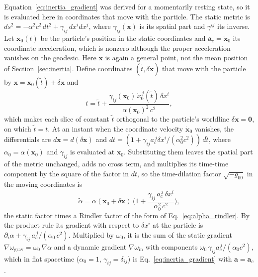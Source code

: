 \documentclass[aps,prd,onecolumn,tightenlines,nofootinbib,notitlepage,11pt,floatfix]{revtex4-2}
\theoremstyle{indentedtheorem}
\begin{document}
Equation~\eqref{eq:inertia_gradient} was derived for a momentarily resting state, so it is evaluated here in coordinates that move with the particle. The static metric is $ds^2=-\alpha^2c^2\,dt^2+\gamma_{ij}\,dx^idx^j$, where $\gamma_{ij}(\mathbf{x})$ is its spatial part and $\gamma^{ij}$ its inverse. Let $\mathbf{x}_0(t)$ be the particle's position in the static coordinates and $\mathbf{a}_c=\ddot{\mathbf{x}}_0$ its coordinate acceleration, which is nonzero although the proper acceleration vanishes on the geodesic. Here $\mathbf{x}$ is again a general point, not the mean position of Section~\ref{sec:inertia}. Define coordinates $(\tilde{t},\delta\mathbf{x})$ that move with the particle by $\mathbf{x}=\mathbf{x}_0(\tilde{t})+\delta\mathbf{x}$ and
\begin{equation}
    t = \tilde{t} + \frac{\gamma_{ij}(\mathbf{x}_0)\,\dot{x}_0^{\,j}(\tilde{t})\,\delta x^i}{\alpha(\mathbf{x}_0)^2\,c^2} ,
    \label{eq:moving_sync}
\end{equation}
which makes each slice of constant $\tilde{t}$ orthogonal to the particle's worldline $\delta\mathbf{x}=\mathbf{0}$, on which $\tilde{t}=t$. At an instant when the coordinate velocity $\dot{\mathbf{x}}_0$ vanishes, the differentials are $d\mathbf{x}=d(\delta\mathbf{x})$ and $dt=(1+\gamma_{ij}a_c^{\,j}\delta x^i/(\alpha_0^2c^2))\,d\tilde{t}$, where $\alpha_0=\alpha(\mathbf{x}_0)$ and $\gamma_{ij}$ is evaluated at $\mathbf{x}_0$. Substituting them leaves the spatial part of the metric unchanged, adds no cross term, and multiplies its time-time component by the square of the factor in $dt$, so the time-dilation factor $\sqrt{-g_{00}}$ in the moving coordinates is
\begin{equation}
    \tilde{\alpha} = \alpha(\mathbf{x}_0+\delta\mathbf{x}) \, \Big(1+\frac{\gamma_{ij}\,a_c^{\,j}\,\delta x^i}{\alpha_0^2\,c^2}\Big) ,
    \label{eq:moving_frame_alpha}
\end{equation}
the static factor times a Rindler factor of the form of Eq.~\eqref{eq:alpha_rindler}. By the product rule its gradient with respect to $\delta x^i$ at the particle is $\partial_i\alpha+\gamma_{ij}\,a_c^{\,j}/(\alpha_0\,c^2)$. Multiplied by $\omega_0$, it is the sum of the static gradient $\nabla\omega_\text{grav}=\omega_0\,\nabla\alpha$ and a dynamic gradient $\nabla\omega_\text{in}$ with components $\omega_0\,\gamma_{ij}a_c^{\,j}/(\alpha_0c^2)$, which in flat spacetime ($\alpha_0=1$, $\gamma_{ij}=\delta_{ij}$) is Eq.~\eqref{eq:inertia_gradient} with $\mathbf{a}=\mathbf{a}_c$.
\end{document}

